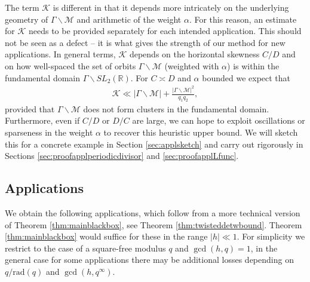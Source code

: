 \documentclass[12pt]{amsart}
\theoremstyle{definition}
\theoremstyle{remark}
\numberwithin{equation}{section}
\newcommand{\R}{{\mathbb R}}
\newcommand{\1}{{\mathbf 1}}
\begin{document}
The term $\mathcal{K}$ is different in that it depends more intricately on the underlying geometry of $\Gamma \backslash \mathcal{M}$ and arithmetic of the weight $\alpha$. For this reason, an estimate for $\mathcal{K}$ needs to be provided separately for each intended application. This should not be seen as a defect -- it is what gives the strength of our method for new applications. In general terms, $\mathcal{K}$ depends on the horizontal skewness $C/D$ and on how well-spaced the set of orbits $\Gamma \backslash \mathcal{M}$ (weighted with $\alpha$) is within the fundamental domain $\Gamma \backslash SL_{2}(\R)$. For $C\asymp D$ and $\alpha$ bounded we expect that
 \begin{align*}
     \mathcal{K} \ll |\Gamma \backslash \mathcal{M}| + \frac{|\Gamma \backslash \mathcal{M}|^2}{q_1q_2},
 \end{align*}
provided that $\Gamma \backslash \mathcal{M}$ does not form clusters in the fundamental domain. Furthermore, even if $C/D$ or $D/C$ are large, we can hope to exploit oscillations or sparseness in the weight $\alpha$ to recover this heuristic upper bound. We will sketch this for a concrete example in Section \ref{sec:applsketch} and carry out rigorously in Sections \ref{sec:proofapplperiodicdivisor} and \ref{sec:proofapplLfunc}. 

\subsection{Applications} \label{subsec:appli}
We obtain the following applications, which follow from a more technical version of Theorem \ref{thm:mainblackbox}, see Theorem \ref{thm:twisteddetwbound}. Theorem \ref{thm:mainblackbox} would suffice for these in the range $|h| \ll 1$.  For simplicity we restrict to the case of a square-free modulus $q$ and $\gcd(h,q)=1$, in the general case for some applications there may be additional losses depending on $q/\mathrm{rad}(q)$ and $\gcd(h,q^\infty)$.  
\end{document}
